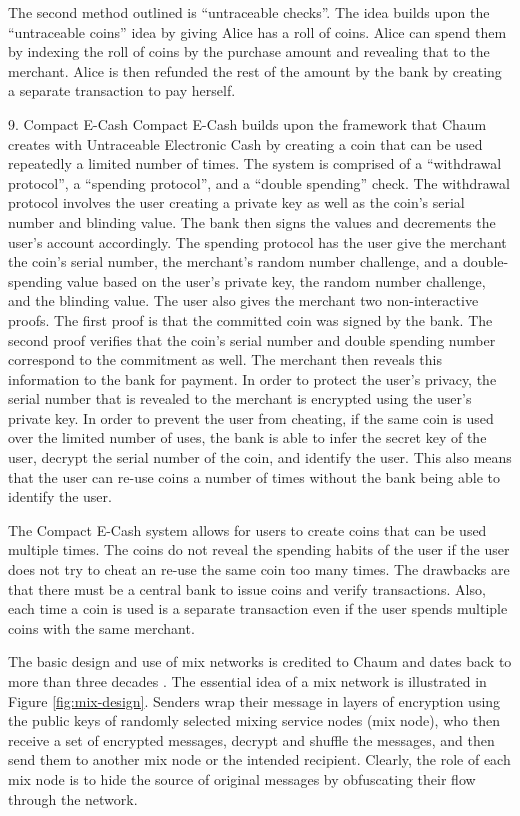 The second method outlined is “untraceable checks”.  The idea builds upon the “untraceable coins” idea by giving Alice has a roll of coins.  Alice can spend them by indexing the roll of coins by the purchase amount and revealing that to the merchant.  Alice is then refunded the rest of the amount by the bank by creating a separate transaction to pay herself.

9. Compact E-Cash
Compact E-Cash builds upon the framework that Chaum creates with Untraceable Electronic Cash by creating a coin that can be used repeatedly a limited number of times.  The system is comprised of a “withdrawal protocol”, a “spending protocol”, and a “double spending” check.  The withdrawal protocol involves the user creating a private key as well as the coin’s serial number and blinding value.  The bank then signs the values and decrements the user’s account accordingly.  The spending protocol has the user give the merchant the coin’s serial number, the merchant’s random number challenge, and a double-spending value based on the user’s private key, the random number challenge, and the blinding value.  The user also gives the merchant two non-interactive proofs.  The first proof is that the committed coin was signed by the bank.  The second proof verifies that the coin’s serial number and double spending number correspond to the commitment as well.  The merchant then reveals this information to the bank for payment.  In order to protect the user’s privacy, the serial number that is revealed to the merchant is encrypted using the user’s private key.  In order to prevent the user from cheating, if the same coin is used over the limited number of uses, the bank is able to infer the secret key of the user, decrypt the serial number of the coin, and identify the user.  This also means that the user can re-use coins a number of times without the bank being able to identify the user.
 
The Compact E-Cash system allows for users to create coins that can be used multiple times.  The coins do not reveal the spending habits of the user if the user does not try to cheat an re-use the same coin too many times.  The drawbacks are that there must be a central bank to issue coins and verify transactions.  Also, each time a coin is used is a separate transaction even if the user spends multiple coins with the same merchant.

The basic design and use of mix networks is credited to Chaum and dates back to more than three decades \cite{Chaum81-Mix}. The essential idea of a mix network is illustrated in Figure \ref{fig:mix-design}. Senders wrap their message in layers of encryption using the public keys of randomly selected mixing service nodes (mix node), who then receive a set of encrypted messages, decrypt and shuffle the messages, and then send them to another mix node or the intended recipient. Clearly, the role of each mix node is to hide the source of original messages by obfuscating their flow through the network. 

